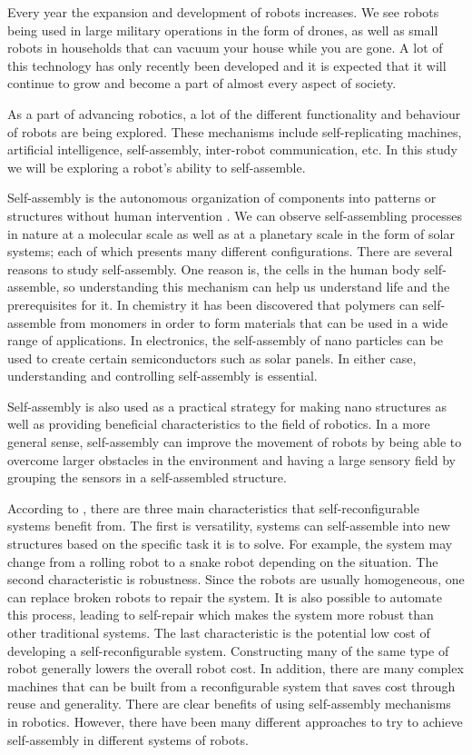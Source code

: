 Every year the expansion and development of robots increases. 
We see robots being used in large military operations in the form of drones, as well as small robots in households that can vacuum your house while you are gone.
A lot of this technology has only recently been developed and it is expected that it will continue to grow and become a part of almost every aspect of society.

As a part of advancing robotics, a lot of the different functionality and behaviour of robots are being explored.
These mechanisms include self-replicating machines, artificial intelligence, self-assembly, inter-robot communication, etc.
In this study we will be exploring a robot's ability to self-assemble. 

Self-assembly is the autonomous organization of components into patterns or structures without human intervention \cite{whitesides_self-assembly_2002}.
We can observe self-assembling processes in nature at a molecular scale \cite{heylighen_science_2001} as well as at a planetary scale in the form of solar systems; each of which presents many different configurations.
There are several reasons to study self-assembly.
One reason is, the cells in the human body self-assemble, so understanding this mechanism can help us understand life and the prerequisites for it.
In chemistry it has been discovered that polymers can self-assemble from monomers in order to form materials that can be used in a wide range of applications\cite{chung_use_2004}\cite{siracusa_biodegradable_2008}. 
In electronics, the self-assembly of nano particles can be used to create certain semiconductors such as solar panels\cite{henini_chapter_2008}.
In either case, understanding and controlling self-assembly is essential.

Self-assembly is also used as a practical strategy for making nano structures as well as providing beneficial characteristics to the field of robotics.
In a more general sense, self-assembly can improve the movement of robots by being able to overcome larger obstacles in the environment and having a large sensory field by grouping the sensors in a self-assembled structure.

According to \cite{yim_modular_2007}, there are three main characteristics that self-reconfigurable systems benefit from.
The first is versatility, systems can self-assemble into new structures based on the specific task it is to solve.
For example, the system may change from a rolling robot to a snake robot depending on the situation.
The second characteristic is robustness.
Since the robots are usually homogeneous, one can replace broken robots to repair the system.
It is also possible to automate this process, leading to self-repair which makes the system more robust than other traditional systems.
The last characteristic is the potential low cost of developing a self-reconfigurable system.
Constructing many of the same type of robot generally lowers the overall robot cost.
In addition, there are many complex machines that can be built from  a reconfigurable system that saves cost through reuse and generality.
There are clear benefits of using self-assembly mechanisms in robotics.
However, there have been many different approaches to try to achieve self-assembly in different systems of robots.

